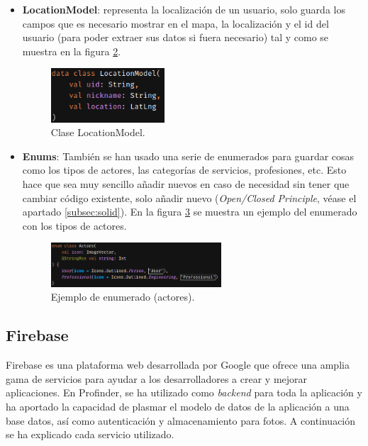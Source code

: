 \begin{itemize}
\begin{figure}[h]
        \label{fig:ChatMsgModel}
    \end{figure}
    \item \textbf{LocationModel}: representa la localización de un usuario, solo guarda los campos que es necesario mostrar en el mapa, la localización y el id del usuario (para poder extraer sus datos si fuera necesario) tal y como se muestra en la figura \ref{fig:LocationModel}.
    \begin{figure}[h]
        \centering
        \includegraphics[width = 0.4\textwidth]{Imagenes/Fuentes/LocationModel.png}
        \caption{Clase LocationModel.}
        \label{fig:LocationModel}
    \end{figure}
    \item \textbf{Enums}: También se han usado una serie de enumerados para guardar cosas como los tipos de actores, las categorías de servicios, profesiones, etc. Esto hace que sea muy sencillo añadir nuevos en caso de necesidad sin tener que cambiar código existente, solo añadir nuevo (\textit{Open/Closed Principle}, véase el apartado \ref{subsec:solid}). En la figura \ref{fig:ejemplo_enum} se muestra un ejemplo del enumerado con los tipos de actores.
    
    \begin{figure}[h]
        \centering
        \includegraphics[width = 0.6\textwidth]{Imagenes/Fuentes/ejemplo_enum.png}
        \caption{Ejemplo de enumerado (actores).}
        \label{fig:ejemplo_enum}
    \end{figure}
\end{itemize}

\hypertarget{subsec:firebase}{}
\subsection{Firebase} 
\label{subsec:firebase}
Firebase \hyperlink{cap:biblio}{} es una plataforma web desarrollada por Google que ofrece una amplia gama de servicios para ayudar a los desarrolladores a crear y mejorar aplicaciones. En Profinder, se ha utilizado como \textit{backend} para toda la aplicación y ha aportado la capacidad de plasmar el modelo de datos de la aplicación a una base datos, así como autenticación y almacenamiento para fotos. A continuación se ha explicado cada servicio utilizado.
